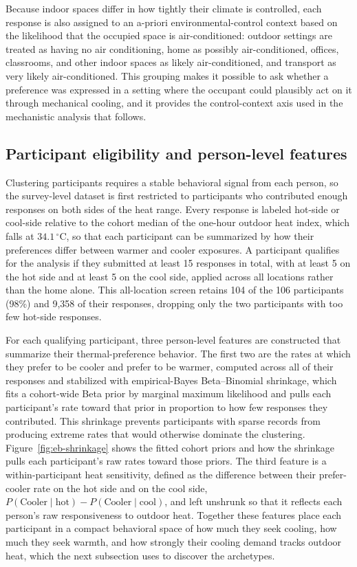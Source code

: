 \documentclass[final,5p,times,twocolumn]{elsarticle}
\begin{document}
Because indoor spaces differ in how tightly their climate is controlled, each response is also assigned to an a-priori environmental-control context based on the likelihood that the occupied space is air-conditioned: outdoor settings are treated as having no air conditioning, home as possibly air-conditioned, offices, classrooms, and other indoor spaces as likely air-conditioned, and transport as very likely air-conditioned.
This grouping makes it possible to ask whether a preference was expressed in a setting where the occupant could plausibly act on it through mechanical cooling, and it provides the control-context axis used in the mechanistic analysis that follows.


\subsection{Participant eligibility and person-level features}\label{sec:features}
Clustering participants requires a stable behavioral signal from each person, so the survey-level dataset is first restricted to participants who contributed enough responses on both sides of the heat range.
Every response is labeled hot-side or cool-side relative to the cohort median of the one-hour outdoor heat index, which falls at $34.1\,^{\circ}$C, so that each participant can be summarized by how their preferences differ between warmer and cooler exposures.
A participant qualifies for the analysis if they submitted at least 15 responses in total, with at least 5 on the hot side and at least 5 on the cool side, applied across all locations rather than the home alone.
This all-location screen retains 104 of the 106 participants (98\%) and 9{,}358 of their responses, dropping only the two participants with too few hot-side responses.

For each qualifying participant, three person-level features are constructed that summarize their thermal-preference behavior.
The first two are the rates at which they prefer to be cooler and prefer to be warmer, computed across all of their responses and stabilized with empirical-Bayes Beta--Binomial shrinkage, which fits a cohort-wide Beta prior by marginal maximum likelihood and pulls each participant's rate toward that prior in proportion to how few responses they contributed.
This shrinkage prevents participants with sparse records from producing extreme rates that would otherwise dominate the clustering.
Figure~\ref{fig:eb-shrinkage} shows the fitted cohort priors and how the shrinkage pulls each participant's raw rates toward those priors.
The third feature is a within-participant heat sensitivity, defined as the difference between their prefer-cooler rate on the hot side and on the cool side, $P(\mathrm{Cooler}\mid\mathrm{hot}) - P(\mathrm{Cooler}\mid\mathrm{cool})$, and left unshrunk so that it reflects each person's raw responsiveness to outdoor heat.
Together these features place each participant in a compact behavioral space of how much they seek cooling, how much they seek warmth, and how strongly their cooling demand tracks outdoor heat, which the next subsection uses to discover the archetypes.
\end{document}

